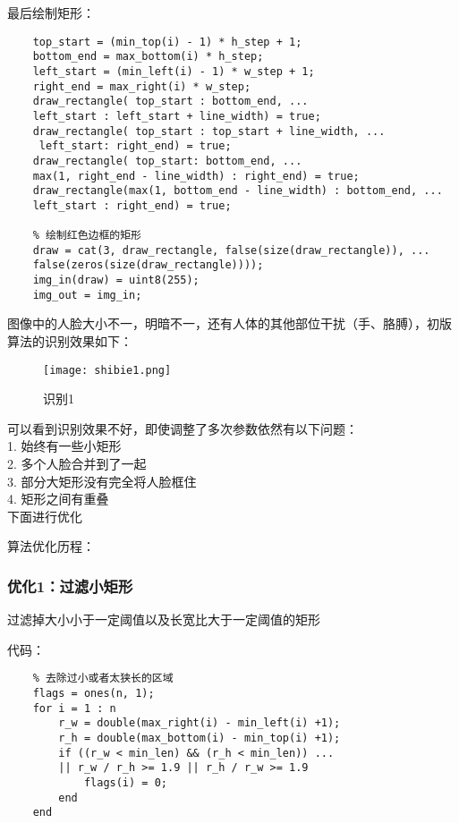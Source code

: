 \documentclass[12pt]{article}
\begin{document}
最后绘制矩形：
\begin{lstlisting}
    top_start = (min_top(i) - 1) * h_step + 1;
    bottom_end = max_bottom(i) * h_step;
    left_start = (min_left(i) - 1) * w_step + 1;
    right_end = max_right(i) * w_step;
    draw_rectangle( top_start : bottom_end, ... 
    left_start : left_start + line_width) = true;
    draw_rectangle( top_start : top_start + line_width, ... 
     left_start: right_end) = true;
    draw_rectangle( top_start: bottom_end, ... 
    max(1, right_end - line_width) : right_end) = true;
    draw_rectangle(max(1, bottom_end - line_width) : bottom_end, ... 
    left_start : right_end) = true;
    
    % 绘制红色边框的矩形
    draw = cat(3, draw_rectangle, false(size(draw_rectangle)), ... 
    false(zeros(size(draw_rectangle))));
    img_in(draw) = uint8(255);
    img_out = img_in;
\end{lstlisting}

图像中的人脸大小不一，明暗不一，还有人体的其他部位干扰（手、胳膊），初版算法的识别效果如下：

\begin{figure}[H]
    \centering
    \texttt{[image: shibie1.png]}
    \caption{识别1}
\end{figure}

可以看到识别效果不好，即使调整了多次参数依然有以下问题：\\
\hspace*{2em}1. 始终有一些小矩形 \\
\hspace*{2em}2. 多个人脸合并到了一起\\
\hspace*{2em}3. 部分大矩形没有完全将人脸框住\\
\hspace*{2em}4. 矩形之间有重叠\\
\hspace*{2em}下面进行优化

算法优化历程：

\subsubsection{优化1：过滤小矩形}
过滤掉大小小于一定阈值以及长宽比大于一定阈值的矩形

代码：
\begin{lstlisting}
    % 去除过小或者太狭长的区域
    flags = ones(n, 1);
    for i = 1 : n
        r_w = double(max_right(i) - min_left(i) +1);
        r_h = double(max_bottom(i) - min_top(i) +1);
        if ((r_w < min_len) && (r_h < min_len)) ... 
        || r_w / r_h >= 1.9 || r_h / r_w >= 1.9
            flags(i) = 0;
        end
    end
\end{lstlisting}
\end{document}
